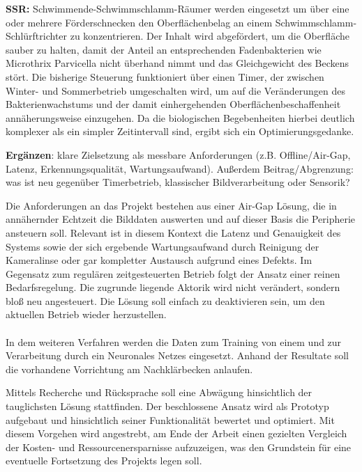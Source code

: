 \textbf{SSR:} Schwimmende-Schwimmschlamm-Räumer werden eingesetzt um über eine oder mehrere Förderschnecken den Oberflächenbelag an einem Schwimmschlamm-Schlürftrichter zu konzentrieren. Der Inhalt wird abgefördert, um die Oberfläche sauber zu halten, damit der Anteil an entsprechenden Fadenbakterien wie Microthrix Parvicella nicht überhand nimmt und das Gleichgewicht des Beckens stört.
Die bisherige Steuerung funktioniert über einen Timer, der zwischen Winter- und Sommerbetrieb umgeschalten wird, um auf die Veränderungen des Bakterienwachstums und der damit einhergehenden Oberflächenbeschaffenheit annäherungsweise einzugehen. Da die biologischen Begebenheiten hierbei deutlich komplexer als ein simpler Zeitintervall sind, ergibt sich ein Optimierungsgedanke.

\textbf{Ergänzen}: klare Zielsetzung als messbare Anforderungen (z.B. Offline/Air-Gap, Latenz, Erkennungsqualität, Wartungsaufwand). Außerdem Beitrag/Abgrenzung: was ist neu gegenüber Timerbetrieb, klassischer Bildverarbeitung oder Sensorik?

Die Anforderungen an das Projekt bestehen aus einer Air-Gap Lösung, die in annähernder Echtzeit die Bilddaten auswerten und auf dieser Basis die Peripherie ansteuern soll. Relevant ist in diesem Kontext die Latenz und Genauigkeit des Systems sowie der sich ergebende Wartungsaufwand durch Reinigung der Kameralinse oder gar kompletter Austausch aufgrund eines Defekts. 
Im Gegensatz zum regulären zeitgesteuerten Betrieb folgt der Ansatz einer reinen Bedarfsregelung. Die zugrunde liegende Aktorik wird nicht verändert, sondern bloß neu angesteuert. Die Lösung soll einfach zu deaktivieren sein, um den aktuellen Betrieb wieder herzustellen. \\ \\ 



In dem weiteren Verfahren werden die Daten zum Training von einem und zur Verarbeitung durch ein Neuronales Netzes eingesetzt. Anhand der Resultate soll die vorhandene Vorrichtung am Nachklärbecken anlaufen.

Mittels Recherche und Rücksprache soll eine Abwägung hinsichtlich der tauglichsten Lösung stattfinden. Der beschlossene Ansatz wird als Prototyp aufgebaut und hinsichtlich seiner Funktionalität bewertet und optimiert. Mit diesem Vorgehen wird angestrebt, am Ende der Arbeit einen gezielten Vergleich der Kosten- und Ressourcenersparnisse aufzuzeigen, was den Grundstein für eine eventuelle Fortsetzung des Projekts legen soll.


